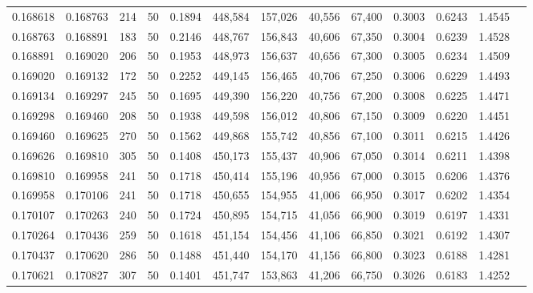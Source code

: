 \begin{tabular}{rrrrrrrrrrrrr}
0.168618 & 0.168763 &   214 &  50 &                                     0.1894 & 448,584 & 157,026 &  40,556 &  67,400 & 0.3003 & 0.6243 & 1.4545 \\
0.168763 & 0.168891 &   183 &  50 &                                     0.2146 & 448,767 & 156,843 &  40,606 &  67,350 & 0.3004 & 0.6239 & 1.4528 \\
0.168891 & 0.169020 &   206 &  50 &                                     0.1953 & 448,973 & 156,637 &  40,656 &  67,300 & 0.3005 & 0.6234 & 1.4509 \\
0.169020 & 0.169132 &   172 &  50 &                                     0.2252 & 449,145 & 156,465 &  40,706 &  67,250 & 0.3006 & 0.6229 & 1.4493 \\
0.169134 & 0.169297 &   245 &  50 &                                     0.1695 & 449,390 & 156,220 &  40,756 &  67,200 & 0.3008 & 0.6225 & 1.4471 \\
0.169298 & 0.169460 &   208 &  50 &                                     0.1938 & 449,598 & 156,012 &  40,806 &  67,150 & 0.3009 & 0.6220 & 1.4451 \\
0.169460 & 0.169625 &   270 &  50 &                                     0.1562 & 449,868 & 155,742 &  40,856 &  67,100 & 0.3011 & 0.6215 & 1.4426 \\
0.169626 & 0.169810 &   305 &  50 &                                     0.1408 & 450,173 & 155,437 &  40,906 &  67,050 & 0.3014 & 0.6211 & 1.4398 \\
0.169810 & 0.169958 &   241 &  50 &                                     0.1718 & 450,414 & 155,196 &  40,956 &  67,000 & 0.3015 & 0.6206 & 1.4376 \\
0.169958 & 0.170106 &   241 &  50 &                                     0.1718 & 450,655 & 154,955 &  41,006 &  66,950 & 0.3017 & 0.6202 & 1.4354 \\
0.170107 & 0.170263 &   240 &  50 &                                     0.1724 & 450,895 & 154,715 &  41,056 &  66,900 & 0.3019 & 0.6197 & 1.4331 \\
0.170264 & 0.170436 &   259 &  50 &                                     0.1618 & 451,154 & 154,456 &  41,106 &  66,850 & 0.3021 & 0.6192 & 1.4307 \\
0.170437 & 0.170620 &   286 &  50 &                                     0.1488 & 451,440 & 154,170 &  41,156 &  66,800 & 0.3023 & 0.6188 & 1.4281 \\
0.170621 & 0.170827 &   307 &  50 &                                     0.1401 & 451,747 & 153,863 &  41,206 &  66,750 & 0.3026 & 0.6183 & 1.4252 \\

\end{tabular}

